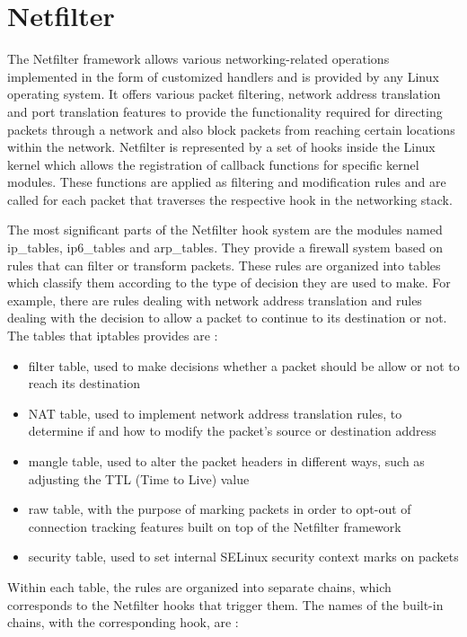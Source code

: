 \section{Netfilter}

The Netfilter framework \citep{netfilterorg} allows various networking-related operations implemented in the form of customized handlers and is provided by any Linux operating system. It offers various packet filtering, network address translation and port translation features to provide the functionality required for directing packets through a network and also block packets from reaching certain locations within the network. Netfilter is represented by a set of hooks inside the Linux kernel which allows the registration of callback functions for specific kernel modules. These functions are applied as filtering and modification rules and are called for each packet that traverses the respective hook in the networking stack.

The most significant parts of the Netfilter hook system are the modules named ip\_tables, ip6\_tables and arp\_tables. They provide a firewall system based on rules that can filter or transform packets. These rules are organized into tables which classify them according to the type of decision they are used to make. For example, there are rules dealing with network address translation and rules dealing with the decision to allow a packet to continue to its destination or not. The tables that iptables provides are \citep{ellingwood2015iptables}:

\begin{itemize}
\item filter table, used to make decisions whether a packet should be allow or not to reach its destination
\item NAT table, used to implement network address translation rules, to determine if and how to modify the packet's source or destination address
\item mangle table, used to alter the packet headers in different ways, such as adjusting the TTL (Time to Live) value
\item raw table, with the purpose of marking packets in order to opt-out of connection tracking features built on top of the Netfilter framework
\item security table, used to set internal SELinux security context marks on packets
\end{itemize}

Within each table, the rules are organized into separate chains, which corresponds to the Netfilter hooks that trigger them. The names of the built-in chains, with the corresponding hook, are \citep{ellingwood2015iptables}:

